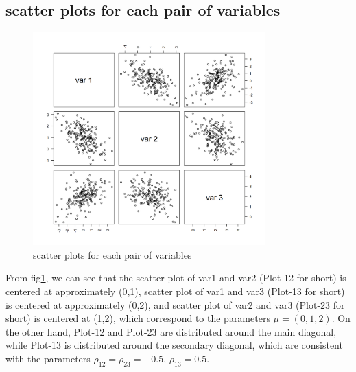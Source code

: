 \documentclass{article}
\begin{document}
    \subsection{scatter plots for each pair of variables}
    \begin{figure}[H]
        \centering  %
        \includegraphics[width=0.8\textwidth]{pairs}
        \caption{scatter plots for each pair of variables}
        \label{pairPlot}
    \end{figure}
    
    From fig\ref{pairPlot}, we can see that the scatter plot of var1 and var2 (Plot-12 for short) is centered at
    approximately (0,1), scatter plot of var1 and var3 (Plot-13 for short) is centered at approximately (0,2),
    and scatter plot of var2 and var3 (Plot-23 for short) is centered at (1,2), which correspond to the parameters
    $\mu = (0,1,2)$. On the other hand,  Plot-12 and Plot-23 are distributed around the main
    diagonal, while Plot-13 is distributed around the secondary diagonal, which are consistent with the parameters
    $\rho_{12}=\rho_{23}=-0.5, \, \rho_{13} = 0.5$.
\end{document}
